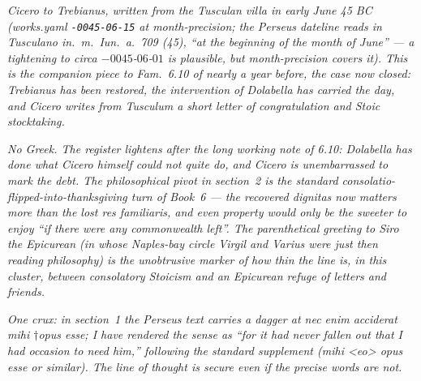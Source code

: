 
\textit{Cicero to Trebianus, written from the Tusculan villa
in early June 45 BC (works.yaml \texttt{-0045-06-15} at
month-precision; the Perseus dateline reads \textit{in Tusculano
in.~m.~Iun.~a.~709 (45)}, ``at the beginning of the month of June''
--- a tightening to \textit{circa} ${-}0045$-$06$-$01$ is plausible,
but month-precision covers it). This is the companion piece to
\textit{Fam.}~6.10 of nearly a year before, the case now closed:
Trebianus has been restored, the intervention of Dolabella has
carried the day, and Cicero writes from Tusculum a short letter
of congratulation and Stoic stocktaking.}

\textit{No Greek. The register lightens after the long working
note of 6.10: Dolabella has done what Cicero himself could not
quite do, and Cicero is unembarrassed to mark the debt. The
philosophical pivot in section~2 is the standard
\textit{consolatio}-flipped-into-thanksgiving turn of Book~6 ---
the recovered \textit{dignitas} now matters more than the lost
\textit{res familiaris}, and even property would only be the
sweeter to enjoy ``if there were any commonwealth left''. The
parenthetical greeting to Siro the Epicurean (in whose Naples-bay
circle Virgil and Varius were just then reading philosophy) is
the unobtrusive marker of how thin the line is, in this cluster,
between consolatory Stoicism and an Epicurean refuge of letters
and friends.}

\textit{One crux: in section~1 the Perseus text carries a dagger
at \textit{nec enim acciderat mihi $\dagger$opus esse}; I have
rendered the sense as ``for it had never fallen out that I had
occasion to need him,'' following the standard supplement
(\textit{mihi <eo> opus esse} or similar). The line of thought is
secure even if the precise words are not.}
